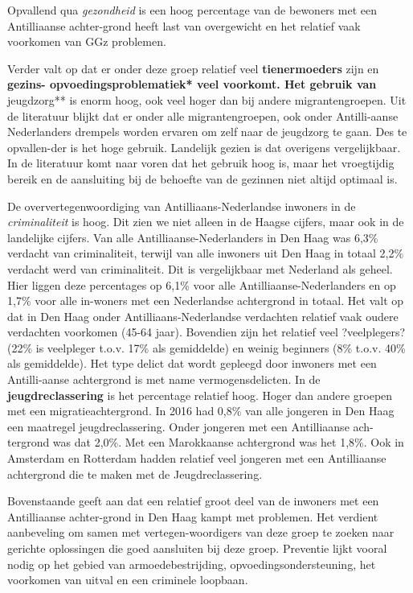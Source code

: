 \documentclass[]{book}
\begin{document}
Opvallend qua \emph{gezondheid} is een hoog percentage van de bewoners
met een Antilliaanse achter-grond heeft last van overgewicht en het
relatief vaak voorkomen van GGz problemen.

Verder valt op dat er onder deze groep relatief veel
\textbf{tienermoeders} zijn en \textbf{gezins- opvoedingsproblematiek*
veel voorkomt. Het gebruik van }jeugdzorg** is enorm hoog, ook veel
hoger dan bij andere migrantengroepen. Uit de literatuur blijkt dat er
onder alle migrantengroepen, ook onder Antilli-aanse Nederlanders
drempels worden ervaren om zelf naar de jeugdzorg te gaan. Des te
opvallen-der is het hoge gebruik. Landelijk gezien is dat overigens
vergelijkbaar. In de literatuur komt naar voren dat het gebruik hoog is,
maar het vroegtijdig bereik en de aansluiting bij de behoefte van de
gezinnen niet altijd optimaal is.

De oververtegenwoordiging van Antilliaans-Nederlandse inwoners in de
\emph{criminaliteit} is hoog. Dit zien we niet alleen in de Haagse
cijfers, maar ook in de landelijke cijfers. Van alle
Antilliaanse-Nederlanders in Den Haag was 6,3\% verdacht van
criminaliteit, terwijl van alle inwoners uit Den Haag in totaal 2,2\%
verdacht werd van criminaliteit. Dit is vergelijkbaar met Nederland als
geheel. Hier liggen deze percentages op 6,1\% voor alle
Antilliaanse-Nederlanders en op 1,7\% voor alle in-woners met een
Nederlandse achtergrond in totaal. Het valt op dat in Den Haag onder
Antilliaans-Nederlandse verdachten relatief vaak oudere verdachten
voorkomen (45-64 jaar). Bovendien zijn het relatief veel ?veelplegers?
(22\% is veelpleger t.o.v. 17\% als gemiddelde) en weinig beginners (8\%
t.o.v. 40\% als gemiddelde). Het type delict dat wordt gepleegd door
inwoners met een Antilli-aanse achtergrond is met name
vermogensdelicten. In de \textbf{jeugdreclassering} is het percentage
relatief hoog. Hoger dan andere groepen met een migratieachtergrond. In
2016 had 0,8\% van alle jongeren in Den Haag een maatregel
jeugdreclassering. Onder jongeren met een Antilliaanse ach-tergrond was
dat 2,0\%. Met een Marokkaanse achtergrond was het 1,8\%. Ook in
Amsterdam en Rotterdam hadden relatief veel jongeren met een
Antilliaanse achtergrond die te maken met de Jeugdreclassering.

Bovenstaande geeft aan dat een relatief groot deel van de inwoners met
een Antilliaanse achter-grond in Den Haag kampt met problemen. Het
verdient aanbeveling om samen met vertegen-woordigers van deze groep te
zoeken naar gerichte oplossingen die goed aansluiten bij deze groep.
Preventie lijkt vooral nodig op het gebied van armoedebestrijding,
opvoedingsondersteuning, het voorkomen van uitval en een criminele
loopbaan.


\end{document}
